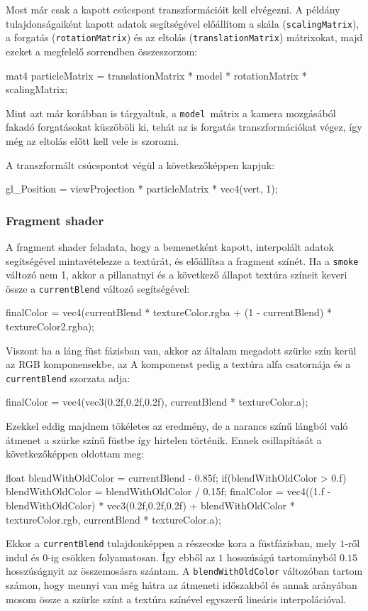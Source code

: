 Most már csak a kapott csúcspont transzformációit kell elvégezni. A példány tulajdonságaiként kapott adatok segítségével előállítom a skála (\texttt{scalingMatrix}), a forgatás (\texttt{rotationMatrix}) és az eltolás (\texttt{translationMatrix}) mátrixokat, majd ezeket a megfelelő sorrendben összeszorzom:
\begin{cpp}
mat4 particleMatrix = translationMatrix * model * rotationMatrix
							 * scalingMatrix;
\end{cpp}
Mint azt már korábban is tárgyaltuk, a \texttt{model }mátrix a kamera mozgásából fakadó forgatásokat küszöböli ki, tehát az is forgatás transzformációkat végez, így még az eltolás előtt kell vele is szorozni.

A transzformált csúcspontot végül a következőképpen kapjuk:
\begin{cpp}
gl_Position = viewProjection * particleMatrix * vec4(vert, 1);
\end{cpp}


\subsubsection{Fragment shader}
A fragment shader feladata, hogy a bemenetként kapott, interpolált adatok segítségével mintavételezze a textúrát, és előállítsa a fragment színét. Ha a \texttt{smoke} változó nem 1, akkor a pillanatnyi és a következő állapot textúra színeit keveri össze a \texttt{currentBlend} változó segítségével:
\begin{cpp}
finalColor = vec4(currentBlend * textureColor.rgba 
	     + (1 - currentBlend) * textureColor2.rgba);
\end{cpp}

Viszont ha a láng füst fázisban van, akkor az általam megadott szürke szín kerül az RGB komponensekbe, az A komponenst pedig a textúra alfa csatornája és a \texttt{currentBlend} szorzata adja: 
\begin{cpp}
finalColor = vec4(vec3(0.2f,0.2f,0.2f), currentBlend * textureColor.a);
\end{cpp}

Ezekkel eddig majdnem tökéletes az eredmény, de a narancs színű lángból való átmenet a szürke színű füstbe így hirtelen történik. Ennek csillapítását a következőképpen oldottam meg:
\begin{cpp}
float blendWithOldColor = currentBlend - 0.85f;
if(blendWithOldColor > 0.f) {
   blendWithOldColor = blendWithOldColor / 0.15f;
   finalColor = vec4((1.f - blendWithOldColor) * vec3(0.2f,0.2f,0.2f) 
   + blendWithOldColor * textureColor.rgb, currentBlend * textureColor.a);
}
\end{cpp}
Ekkor a \texttt{currentBlend} tulajdonképpen a részecske kora a füstfázisban, mely $1$-ről indul és $0$-ig csökken folyamatosan. Így ebből az $1$ hosszúságú tartományból $0.15$ hosszúságnyit az összemosásra szántam. A \texttt{blendWithOldColor} változóban tartom számon, hogy mennyi van még hátra az átmeneti időszakból és annak arányában mosom össze a szürke színt a textúra színével egyszerű lineáris interpolációval.

